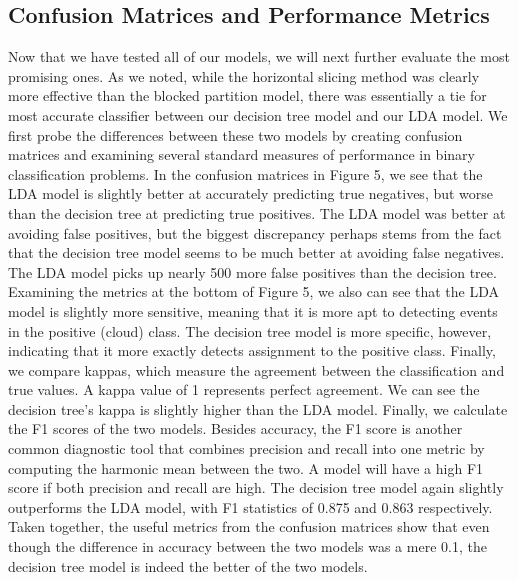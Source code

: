 \documentclass[12pt]{article}
\begin{document}
\subsection{Confusion Matrices and Performance Metrics}
Now that we have tested all of our models, we will next further evaluate the most promising ones. As we noted, while the horizontal slicing method was clearly more effective than the blocked partition model, there was essentially a tie for most accurate classifier between our decision tree model and our LDA model. We first probe the differences between these two models by creating confusion matrices and examining several standard measures of performance in binary classification problems. In the confusion matrices in Figure 5, we see that the LDA model is slightly better at accurately predicting true negatives, but worse than the decision tree at predicting true positives. The LDA model was better at avoiding false positives, but the biggest discrepancy perhaps stems from the fact that the decision tree model seems to be much better at avoiding false negatives. The LDA model picks up nearly 500 more false positives than the decision tree.  
\newline
\newline
Examining the metrics at the bottom of Figure 5, we also can see that the LDA model is slightly more sensitive, meaning that it is more apt to detecting events in the positive (cloud) class. The decision tree model is more specific, however, indicating that it more exactly detects assignment to the positive class. Finally, we compare kappas, which measure the agreement between the classification and true values. A kappa value of 1 represents perfect agreement. We can see the decision tree's kappa is slightly higher than the LDA model. 
\newline
\newline
Finally, we calculate the F1 scores of the two models. Besides accuracy, the F1 score is another common diagnostic tool that combines precision and recall into one metric by computing the harmonic mean between the two. A model will have a high F1 score if both precision and recall are high. The decision tree model again slightly outperforms the LDA model, with F1 statistics of 0.875 and 0.863 respectively. Taken together, the useful metrics from the confusion matrices show that even though the difference in accuracy between the two models was a mere 0.1, the decision tree model is indeed the better of the two models.  
\end{document}
